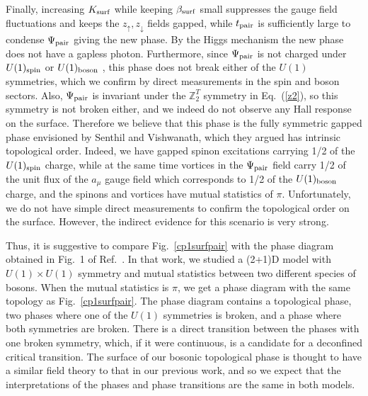 \documentclass[prb,twocolumn]{revtex4-1}
\def\ztwot{\mathbb{Z}_2^T}
\begin{document}
Finally, increasing $K_{\rm surf}$ while keeping $\beta_{\rm surf}$ small suppresses the gauge field fluctuations and keeps the $z_\uparrow, z_\downarrow$ fields gapped, while $t_{\rm pair}$ is sufficiently large to condense $\Psi_{\rm pair}$ giving the new phase.  By the Higgs mechanism the new phase does not have a gapless photon.  Furthermore, since $\Psi_{\rm pair}$ is not charged under $U(1)_{\rm spin}$ or $U(1)_{\rm boson}$ , this phase does not break either of the $U(1)$ symmetries, which we confirm by direct measurements in the spin and boson sectors.  Also,  $\Psi_{\rm pair}$ is invariant under the $\ztwot$ symmetry in Eq.~(\ref{z2}), so this symmetry is not broken either, and we indeed do not observe any Hall response on the surface.  Therefore we believe that this phase is the fully symmetric gapped phase envisioned by Senthil and Vishwanath, which they argued has intrinsic topological order.  Indeed, we have gapped spinon excitations carrying 1/2 of the $U(1)_{\rm spin}$ charge, while at the same time vortices in the $\Psi_{\rm pair}$ field carry 1/2 of the unit flux of the $a_\mu$ gauge field which corresponds to 1/2 of the $U(1)_{\rm boson}$ charge, and the spinons and vortices have mutual statistics of $\pi$.  Unfortunately, we do not have simple direct measurements to confirm the topological order on the surface.  However, the indirect evidence for this scenario is very strong.

Thus, it is suggestive to compare Fig.~\ref{cp1surfpair} with the phase diagram obtained in Fig.~1 of Ref.~. In that work, we studied a (2+1)D model with $U(1)\times U(1)$ symmetry and mutual statistics between two different species of bosons. When the mutual statistics is $\pi$, we get a phase diagram with the same topology as Fig.~\ref{cp1surfpair}. The phase diagram contains a topological phase, two phases where one of the $U(1)$ symmetries is broken, and a phase where both symmetries are broken. There is a direct transition between the phases with one broken symmetry, which, if it were continuous, is a candidate for a deconfined critical transition.\cite{Gen2Loops} The surface of our bosonic topological phase is thought to have a similar field theory to that in our previous work,\cite{Loopy,Gen2Loops} and so we expect that the interpretations of the phases and phase transitions are the same in both models.
\end{document}
